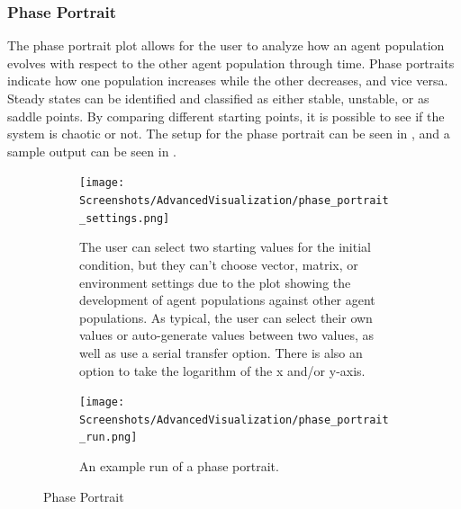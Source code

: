 \subsubsection{Phase Portrait}
\label{sec:phase_portrait}
The phase portrait plot allows for the user to analyze how an agent population evolves with respect to the other agent population through time.
Phase portraits indicate how one population increases while the other decreases, and vice versa.
Steady states can be identified and classified as either stable, unstable, or as saddle points.
By comparing different starting points, it is possible to see if the system is chaotic or not.
The setup for the phase portrait can be seen in , and a sample output can be seen in . 

\begin{figure}[h!]
    \centering
    \begin{subfigure}{0.49\linewidth}
        \centering
        \vspace*{\fill}
        \texttt{[image: Screenshots/AdvancedVisualization/phase\_portrait\_settings.png]}
        \caption{
            The user can select two starting values for the initial condition, but they can't choose vector, matrix, or environment settings due to the plot showing the development of agent populations against other agent populations.
            As typical, the user can select their own values or auto-generate values between two values, as well as use a serial transfer option.
            There is also an option to take the logarithm of the x and/or y-axis. 
        }
        \label{fig:ss:av:phase_portrait_settings}
        \vspace*{\fill}
    \end{subfigure}
    \hfill
    \begin{subfigure}{0.49\linewidth}
        \centering
        \vspace*{\fill}
        \texttt{[image: Screenshots/AdvancedVisualization/phase\_portrait\_run.png]}
        \caption{
            An example run of a phase portrait.
        }
        \label{fig:ss:av:phase_portrait_run}
        \vspace*{\fill}
    \end{subfigure}
    \caption{Phase Portrait}
\end{figure}

